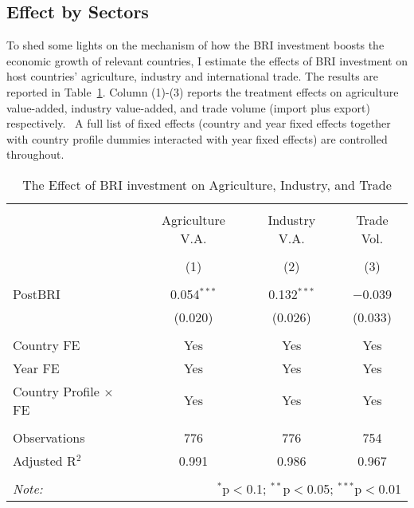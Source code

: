 \documentclass[10pt,a4paper]{article}
\begin{document}
\par\null

\subsection{Effect by Sectors}

{\label{680783}}

To shed some lights on the mechanism of how the BRI investment boosts
the economic growth of relevant countries, I estimate the effects of BRI
investment on host countries' agriculture, industry and international
trade. The results are reported in
Table~{\ref{tab:industry}}. Column (1)-(3) reports the
treatment effects on agriculture value-added, industry value-added, and
trade volume (import plus export) respectively. ~A full list of fixed
effects (country and year fixed effects together with country profile
dummies interacted with year fixed effects) are controlled throughout.~
\begin{table}[!htbp] \centering
  \caption{{The Effect of BRI investment on Agriculture, Industry, and Trade}}
  \label{tab:industry}
\begin{tabular}{@{\extracolsep{5pt}}lccc}
\\[-1.8ex]\hline
\hline \\[-1.8ex]
 & Agriculture V.A. & Industry V.A. & Trade Vol. \\
\\[-1.8ex] & (1) & (2) & (3)\\
\hline \\[-1.8ex]
 PostBRI & 0.054$^{***}$ & 0.132$^{***}$ & $-$0.039 \\
  & (0.020) & (0.026) & (0.033) \\
  & & & \\

Country FE & Yes & Yes & Yes \\
Year FE & Yes & Yes & Yes \\
Country Profile $\times$ FE & Yes & Yes & Yes \\

\hline \\[-1.8ex]
Observations & 776 & 776 & 754 \\
Adjusted R$^{2}$ & 0.991 & 0.986 & 0.967 \\
\hline
\hline \\[-1.8ex]
\textit{Note:}  & \multicolumn{3}{r}{$^{*}$p$<$0.1; $^{**}$p$<$0.05; $^{***}$p$<$0.01} \\
\end{tabular}
\end{table}
\end{document}
